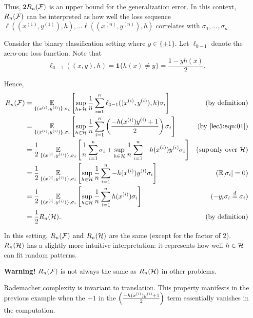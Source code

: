 Thus, $2R_n(\mathcal F)$ is an upper bound for the generalization error. In this context, $R_n(\mathcal F)$ can be interpreted as how well the loss sequence $\ell((x^{(1)}, y^{(1)}), h), \dots \ell((x^{(n)}, y^{(n)}), h)$ correlates with $\sigma_1, \dots, \sigma_n$.
\begin{example}
Consider the binary classification setting where $y \in \{\pm 1\}$. Let $\ell_{0-1}$ denote the zero-one loss function. Note that
\begin{equation}\label{lec5:eqn:01}
    \ell_{0-1}((x,y), h) = \mathbf{1}\{h(x) \neq y\} = \frac{1-yh(x)}{2}.
\end{equation}

Hence,
\begin{align}
    R_n(\mathcal F) &= \operatorname*{\mathbb{E}}_{\{(x^{(i)}, y^{(i)})\}, \sigma_i} \left[ \sup_{h \in \mathcal H} \frac{1}{n}\sum^n_{i=1} \ell_{0-1}((x^{(i)}, y^{(i)}),h)\sigma_i \right] &(\text{by definition}) \\
    &= \operatorname*{\mathbb{E}}_{\{(x^{(i)}, y^{(i)})\}, \sigma_i} \left[ \sup_{h \in \mathcal H} \frac{1}{n}\sum^n_{i=1} \left(\frac{-h(x^{(i)})y^{(i)}+1}{2}\right)\sigma_i \right] &(\text{by } \eqref{lec5:eqn:01}) \\
    &= \frac{1}{2} \operatorname*{\mathbb{E}}_{\{(x^{(i)}, y^{(i)})\}, \sigma_i} \left[ \frac{1}{n}\sum^n_{i=1}\sigma_i + \sup_{h \in \mathcal H} \frac{1}{n}\sum^n_{i=1} -h(x^{(i)})y^{(i)}\sigma_i \right] &(\sup \text{only over } \mathcal H) \\
    &= \frac{1}{2} \operatorname*{\mathbb{E}}_{\{(x^{(i)}, y^{(i)})\}, \sigma_i} \left[\sup_{h \in \mathcal H} \frac{1}{n}\sum^n_{i=1} -h(x^{(i)})y^{(i)}\sigma_i \right] &(\operatorname*{\mathbb{E}} [\sigma_i] = 0) \\
    &=\frac{1}{2} \operatorname*{\mathbb{E}}_{\{(x^{(i)}, y^{(i)})\}, \sigma_i} \left[\sup_{h \in \mathcal H} \frac{1}{n}\sum^n_{i=1} h(x^{(i)})\sigma_i \right] &(-y_i \sigma_i \stackrel{d}{=} \sigma_i) \\
    &= \frac{1}{2}R_n(\mathcal H). &(\text{by definition})
\end{align}

In this setting, $R_n(\mathcal F)$ and $R_n(\mathcal H)$ are the same (except for the factor of 2). $R_n(\mathcal H)$ has a slightly more intuitive interpretation: it represents how well $h \in \mathcal H$ can fit random patterns.

\textbf{Warning!} $R_n(\mathcal F)$ is not always the same as $R_n(\mathcal H)$ in other problems.
\end{example}

\begin{remark}
Rademacher complexity is invariant to translation. This property manifests in the previous example when the $+1$ in the $\left(\frac{-h(x^{(i)})y^{(i)}+1}{2}\right)$ term essentially vanishes in the computation.
\end{remark}

